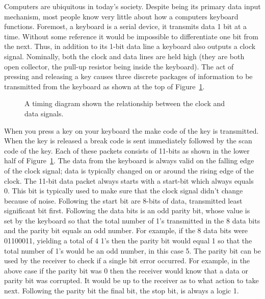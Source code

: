 Computers are ubiquitous in today's society.  Despite being its primary 
data input mechanism, most people know very little about how a computers
keyboard functions.  Foremost, a keyboard is a serial device, it transmits
data 1 bit at a time.  Without some reference it would be impossible
to differentiate one bit from the next.  Thus, in addition to its 1-bit
data line a keyboard also outputs a clock signal.  Nominally, both the
clock and data lines are held high (they are both open collector, the 
pull-up resistor being inside the keyboard).  The act of pressing and releasing 
a key causes three discrete packages of information to be transmitted from
the keyboard as shown at the top of Figure~\ref{fig:commonPeripheralComponentskeyboard}.

\begin{figure}[ht]
\caption{A timing diagram shown the relationship between the
clock and data signals.}
\label{fig:commonPeripheralComponentskeyboard}
\end{figure}

When you press a key on your keyboard the make code of the key is 
transmitted.  When the key is released a break code is sent immediately 
followed by the scan code of the key.  Each of these packets consists
of 11-bits as shown in the lower half of Figure~\ref{fig:commonPeripheralComponentskeyboard}.
The data from the keyboard is always valid on the falling edge of the
clock signal; data is typically changed on or around the rising edge
of the clock.  The 11-bit data packet always starts with a start-bit
which always equals 0.  This bit is typically used to make sure that 
the clock signal didn't change because of noise.  Following the
start bit are 8-bits of data, transmitted least significant bit first.
Following the data bits is an odd parity bit, whose value is set by the 
keyboard so that the total number of 1's transmitted in the 8 data
bits and the parity bit equals an odd number.  For example, if the
8 data bits were 01100011, yielding a total of 4 1's then the parity
bit would equal 1 so that the total number of 1's would be an odd
number, in this case 5.  The parity bit can be used by the receiver
to check if a single bit error occurred.  For example, in the above 
case if the parity bit was 0 then the receiver would know that a data
or parity bit was corrupted.  It would be up to the receiver as
to what action to take next.  Following the parity bit the final
bit, the stop bit, is always a logic 1.

